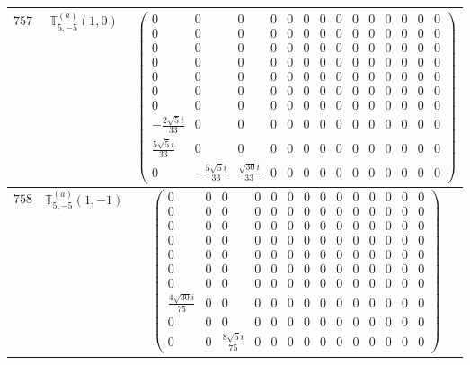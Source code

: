 \documentclass[fleqn,8pt,landscape]{jsarticle}
\begin{document}
\begin{center}
\begin{longtable}{ccc}
$ 757 $ & $ \mathbb{T}_{5,-5}^{(a)}(1,0) $ & $ \begin{pmatrix} 0 & 0 & 0 & 0 & 0 & 0 & 0 & 0 & 0 & 0 & 0 & 0 & 0 & 0 \\ 0 & 0 & 0 & 0 & 0 & 0 & 0 & 0 & 0 & 0 & 0 & 0 & 0 & 0 \\ 0 & 0 & 0 & 0 & 0 & 0 & 0 & 0 & 0 & 0 & 0 & 0 & 0 & 0 \\ 0 & 0 & 0 & 0 & 0 & 0 & 0 & 0 & 0 & 0 & 0 & 0 & 0 & 0 \\ 0 & 0 & 0 & 0 & 0 & 0 & 0 & 0 & 0 & 0 & 0 & 0 & 0 & 0 \\ 0 & 0 & 0 & 0 & 0 & 0 & 0 & 0 & 0 & 0 & 0 & 0 & 0 & 0 \\ 0 & 0 & 0 & 0 & 0 & 0 & 0 & 0 & 0 & 0 & 0 & 0 & 0 & 0 \\ - \frac{2 \sqrt{5} i}{33} & 0 & 0 & 0 & 0 & 0 & 0 & 0 & 0 & 0 & 0 & 0 & 0 & 0 \\ \frac{5 \sqrt{5} i}{33} & 0 & 0 & 0 & 0 & 0 & 0 & 0 & 0 & 0 & 0 & 0 & 0 & 0 \\ 0 & - \frac{5 \sqrt{5} i}{33} & \frac{\sqrt{30} i}{33} & 0 & 0 & 0 & 0 & 0 & 0 & 0 & 0 & 0 & 0 & 0 \end{pmatrix} $ \\ \hline
$ 758 $ & $ \mathbb{T}_{5,-5}^{(a)}(1,-1) $ & $ \begin{pmatrix} 0 & 0 & 0 & 0 & 0 & 0 & 0 & 0 & 0 & 0 & 0 & 0 & 0 & 0 \\ 0 & 0 & 0 & 0 & 0 & 0 & 0 & 0 & 0 & 0 & 0 & 0 & 0 & 0 \\ 0 & 0 & 0 & 0 & 0 & 0 & 0 & 0 & 0 & 0 & 0 & 0 & 0 & 0 \\ 0 & 0 & 0 & 0 & 0 & 0 & 0 & 0 & 0 & 0 & 0 & 0 & 0 & 0 \\ 0 & 0 & 0 & 0 & 0 & 0 & 0 & 0 & 0 & 0 & 0 & 0 & 0 & 0 \\ 0 & 0 & 0 & 0 & 0 & 0 & 0 & 0 & 0 & 0 & 0 & 0 & 0 & 0 \\ 0 & 0 & 0 & 0 & 0 & 0 & 0 & 0 & 0 & 0 & 0 & 0 & 0 & 0 \\ \frac{4 \sqrt{30} i}{75} & 0 & 0 & 0 & 0 & 0 & 0 & 0 & 0 & 0 & 0 & 0 & 0 & 0 \\ 0 & 0 & 0 & 0 & 0 & 0 & 0 & 0 & 0 & 0 & 0 & 0 & 0 & 0 \\ 0 & 0 & \frac{8 \sqrt{5} i}{75} & 0 & 0 & 0 & 0 & 0 & 0 & 0 & 0 & 0 & 0 & 0 \end{pmatrix} $ \\ \hline

\end{longtable}
\end{center}
\end{document}
